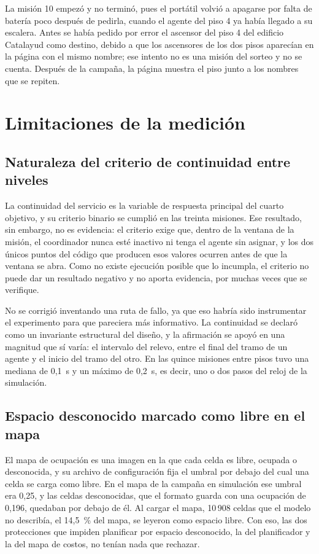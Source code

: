 La misión 10 empezó y no terminó, pues el portátil volvió a apagarse por falta de batería poco después de pedirla, cuando el agente del piso 4 ya había llegado a su escalera. Antes se había pedido por error el ascensor del piso 4 del edificio Catalayud como destino, debido a que los ascensores de los dos pisos aparecían en la página con el mismo nombre; ese intento no es una misión del sorteo y no se cuenta. Después de la campaña, la página muestra el piso junto a los nombres que se repiten.

\section{Limitaciones de la medición}
\label{sec:limitaciones}

\subsection{Naturaleza del criterio de continuidad entre niveles}

La continuidad del servicio es la variable de respuesta principal del cuarto objetivo, y su criterio binario se cumplió en las treinta misiones. Ese resultado, sin embargo, no es evidencia: el criterio exige que, dentro de la ventana de la misión, el coordinador nunca esté inactivo ni tenga el agente sin asignar, y los dos únicos puntos del código que producen esos valores ocurren antes de que la ventana se abra. Como no existe ejecución posible que lo incumpla, el criterio no puede dar un resultado negativo y no aporta evidencia, por muchas veces que se verifique.

No se corrigió inventando una ruta de fallo, ya que eso habría sido instrumentar el experimento para que pareciera más informativo. La continuidad se declaró como un invariante estructural del diseño, y la afirmación se apoyó en una magnitud que sí varía: el intervalo del relevo, entre el final del tramo de un agente y el inicio del tramo del otro. En las quince misiones entre pisos tuvo una mediana de 0,1~s y un máximo de 0,2~s, es decir, uno o dos pasos del reloj de la simulación.

\subsection{Espacio desconocido marcado como libre en el mapa}

El mapa de ocupación es una imagen en la que cada celda es libre, ocupada o desconocida, y su archivo de configuración fija el umbral por debajo del cual una celda se carga como libre. En el mapa de la campaña en simulación ese umbral era 0,25, y las celdas desconocidas, que el formato guarda con una ocupación de 0,196, quedaban por debajo de él. Al cargar el mapa, 10\,908 celdas que el modelo no describía, el 14,5~\% del mapa, se leyeron como espacio libre. Con eso, las dos protecciones que impiden planificar por espacio desconocido, la del planificador y la del mapa de costos, no tenían nada que rechazar.

